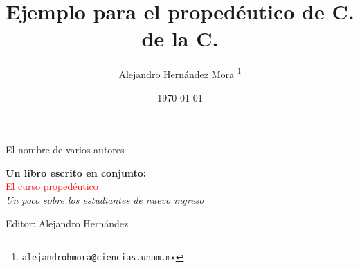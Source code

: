 \documentclass[oneside]{book}
\title{Ejemplo para el propedéutico de C. de la C.}
\author{Alejandro Hernández Mora \thanks{\texttt{alejandrohmora@ciencias.unam.mx}}}
\date{\today}
\theoremstyle{definition}
\begin{document}

\begin{titlepage} %

  \raggedleft %
  
  \vspace*{\baselineskip} %
  
  
  {\Large El nombre de varios autores} %
  
  \vspace*{0.167\textheight} %
  
  
  \textbf{\LARGE Un libro escrito en conjunto:}\\[\baselineskip] %
  
  {\textcolor{Red}{\Huge El curso propedéutico}}\\[\baselineskip] %
  
  {\Large \textit{Un poco sobre los estudiantes de nuevo ingreso}} %
  
  \vfill %
  
  
  {\large Editor: Alejandro Hernández} %
  
  \vspace*{3\baselineskip} %

\end{titlepage}

\tableofcontents %


\listoffigures %


\listoftables %
\end{document}
